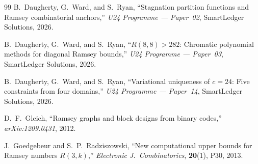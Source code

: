 \documentclass[12pt,a4paper]{article}
\theoremstyle{definition}
\theoremstyle{remark}
\begin{document}
\begin{thebibliography}{99}
B.~Daugherty, G.~Ward, and S.~Ryan,
``Stagnation partition functions and Ramsey combinatorial anchors,''
\textit{U24 Programme --- Paper~02}, SmartLedger Solutions, 2026.

B.~Daugherty, G.~Ward, and S.~Ryan,
``$R(8,8) > 282$: Chromatic polynomial methods for diagonal Ramsey bounds,''
\textit{U24 Programme --- Paper~03}, SmartLedger Solutions, 2026.

B.~Daugherty, G.~Ward, and S.~Ryan,
``Variational uniqueness of $c = 24$: Five constraints from four domains,''
\textit{U24 Programme --- Paper~14}, SmartLedger Solutions, 2026.

D.~F.~Gleich,
``Ramsey graphs and block designs from binary codes,''
\textit{arXiv:1209.0431}, 2012.

J.~Goedgebeur and S.~P.~Radziszowski,
``New computational upper bounds for Ramsey numbers $R(3,k)$,''
\textit{Electronic J.\ Combinatorics}, \textbf{20}(1), P30, 2013.

\end{thebibliography}
\end{document}
